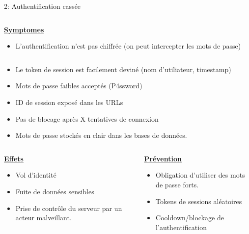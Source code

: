 \documentclass[final,hyperref={pdfpagelabels=false}]{beamer}
\begin{document}
\begin{frame}[t]
\begin{columns}[t]
\begin{column}{.465\textwidth}
\begin{block}{2: Authentification cassée}
\begin{columns}[T]
		\begin{column}{.875\textwidth}
			\uline{\uline{\textbf{Symptomes}}}
			\begin{itemize}
				\item L'authentification n'est pas chiffrée (on peut intercepter les mots de passe)
			\end{itemize}
		\end{column}
	\end{columns}
	\begin{itemize}
		\item Le token de session est facilement deviné (nom d'utiliateur, timestamp)
		\item Mots de passe faibles acceptés (P4ssword)
		\item ID de session exposé dans les URLs
		\item Pas de blocage après X tentatives de connexion
		\item Mots de passe stockés en clair dans les bases de données.
	\end{itemize}
	\begin{columns}[T]
		\begin{column}{0.5\textwidth}
			\vfill
			\uline{\textbf{Effets}}
			\begin{itemize}
				\item Vol d'identité
				\item Fuite de données sensibles
				\item Prise de contrôle du serveur par un acteur malveillant.
			\end{itemize}
			\vfill
		\end{column}
		\begin{column}{0.5\textwidth}
			\vfill
			\uline{\textbf{Prévention}}
			\begin{itemize}
				\item Obligation d'utiliser des mots de passe forts.
				\item Tokens de sessions aléatoires
				\item Cooldown/blockage de l'authentification
			\end{itemize}
		\end{column}
	\end{columns}


\end{block}



\end{column}
\end{columns}
\end{frame}
\end{document}
